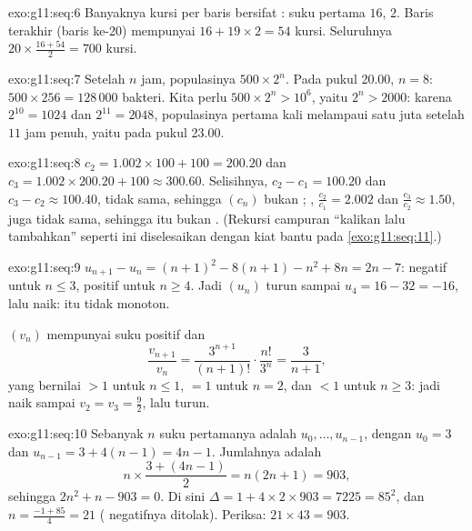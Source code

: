 \begin{solution}{exo:g11:seq:6}
Banyaknya kursi per baris bersifat : suku pertama $16$,  $2$.
Baris terakhir (baris ke-20) mempunyai $16 + 19 \times 2 = 54$ kursi. Seluruhnya
$20 \times \frac{16 + 54}{2} = 700$ kursi.
\end{solution}

\begin{solution}{exo:g11:seq:7}
Setelah $n$ jam, populasinya $500 \times 2^n$. Pada pukul 20.00, $n = 8$:
$500 \times 256 = 128\,000$ bakteri. Kita perlu $500 \times 2^n >
10^6$, yaitu $2^n > 2000$: karena $2^{10} = 1024$ dan $2^{11} = 2048$,
populasinya pertama kali melampaui satu juta setelah $11$ jam penuh, yaitu
pada pukul 23.00.
\end{solution}

\begin{solution}{exo:g11:seq:8}
$c_2 = 1.002 \times 100 + 100 = 200.20$ dan
$c_3 = 1.002 \times 200.20 + 100 \approx 300.60$. Selisihnya,
$c_2 - c_1 = 100.20$ dan $c_3 - c_2 \approx 100.40$, tidak sama, sehingga
$(c_n)$ bukan ; , $\frac{c_2}{c_1} = 2.002$ dan
$\frac{c_3}{c_2} \approx 1.50$, juga tidak sama, sehingga  itu bukan
. (Rekursi campuran ``kalikan lalu tambahkan'' seperti ini
diselesaikan dengan kiat  bantu pada \cref{exo:g11:seq:11}.)
\end{solution}

\begin{solution}{exo:g11:seq:9}
$u_{n+1} - u_n = (n+1)^2 - 8(n+1) - n^2 + 8n = 2n - 7$: negatif untuk
$n \leq 3$, positif untuk $n \geq 4$. Jadi $(u_n)$ turun sampai
$u_4 = 16 - 32 = -16$, lalu naik:  itu tidak monoton.

$(v_n)$ mempunyai suku positif dan
\[
\frac{v_{n+1}}{v_n} = \frac{3^{n+1}}{(n+1)!} \cdot \frac{n!}{3^n}
= \frac{3}{n+1},
\]
yang bernilai $> 1$ untuk $n \leq 1$, $= 1$ untuk $n = 2$, dan $< 1$ untuk
$n \geq 3$: jadi  naik sampai $v_2 = v_3 = \frac92$, lalu
turun.
\end{solution}

\begin{solution}{exo:g11:seq:10}
Sebanyak $n$ suku pertamanya adalah $u_0, \dots, u_{n-1}$, dengan $u_0 = 3$
dan $u_{n-1} = 3 + 4(n-1) = 4n - 1$. Jumlahnya adalah
\[
n \times \frac{3 + (4n-1)}{2} = n(2n + 1) = 903,
\]
sehingga $2n^2 + n - 903 = 0$. Di sini $\Delta = 1 + 4 \times 2 \times 903 =
7225 = 85^2$, dan $n = \frac{-1 + 85}{4} = 21$ ( negatifnya
ditolak). Periksa: $21 \times 43 = 903$.
\end{solution}

